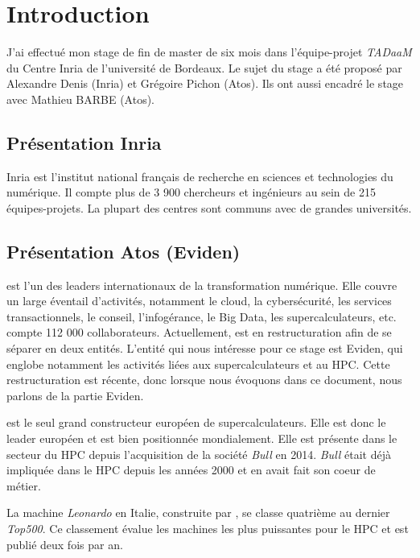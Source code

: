 \section{Introduction}

J'ai effectué mon stage de fin de master de six mois dans l'équipe-projet \emph{TADaaM} du Centre Inria de l'université de Bordeaux.
Le sujet du stage a été proposé par Alexandre Denis (Inria) et Grégoire Pichon (Atos).
Ils ont aussi encadré le stage avec Mathieu BARBE (Atos).

\subsection{Présentation Inria}

Inria est l'institut national français de recherche en sciences et technologies du numérique.
Il compte plus de 3 900 chercheurs et ingénieurs au sein de 215 équipes-projets.
La plupart des centres sont communs avec de grandes universités.


\subsection{Présentation Atos (Eviden)}

\atos{} est l'un des leaders internationaux de la transformation numérique.
Elle couvre un large éventail d'activités, notamment le cloud, la cybersécurité, les services transactionnels, le conseil, l'infogérance, le Big Data, les supercalculateurs, etc.
\atos{} compte 112 000 collaborateurs.
Actuellement, \atos{} est en restructuration afin de se séparer en deux entités.
L'entité qui nous intéresse pour ce stage est Eviden, qui englobe notamment les activités liées aux supercalculateurs et au HPC.
Cette restructuration est récente, donc lorsque nous évoquons \atos{} dans ce document, nous parlons de la partie Eviden.

\atos{} est le seul grand constructeur européen de supercalculateurs.
Elle est donc le leader européen et est bien positionnée mondialement.
Elle est présente dans le secteur du HPC depuis l'acquisition de la société \emph{Bull} en 2014.
\emph{Bull} était déjà impliquée dans le HPC depuis les années 2000 et en avait fait son coeur de métier.

La machine \emph{Leonardo} en Italie, construite par \atos{}, se classe quatrième au dernier \emph{Top500}.
Ce classement évalue les machines les plus puissantes pour le HPC et est publié deux fois par an.

